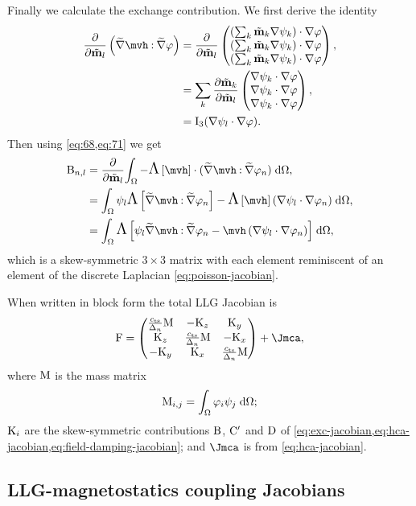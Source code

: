 {Finally we calculate the exchange contribution.
We first derive the identity
\begin{equation}
  \begin{aligned}
    \pd{}{\mvdis_l} \left(\gradv \mvh \compdot \gradv \tbf\right)
    &= \pd{}{\mvdis_l} \threevecdup{\left( \sum_k \mvdis_k \grad \sbf_k \right) \cdot \grad \tbf}, \\
    &=  \sum_k \pd{\mvdis_k}{\mvdis_l} \threevecdup{\grad \sbf_k \cdot \grad \tbf}, \\
    &=  \Idm_3 \bigb{ \grad \sbf_l \cdot \grad \tbf }.
    \label{eq:71}
  \end{aligned}
\end{equation}
Then using \cref{eq:68,eq:71} we get
\begin{equation}
  \begin{aligned}
   \Bm_{n,l} &=  \pd{}{\mvdis_l} \intd{- \skewm{\mvh} \cdot (\gradv \mvh \compdot \gradv \tbf_n)} ,\\
    &= \intd{ \sbf_l \skewm{\gradv \mvh \compdot \gradv \tbf_n}
       - \skewm{\mvh} \left( \grad \sbf_l \cdot \grad \tbf_n \right)}, \\
     &= \intd{\skewm{ \sbf_l \gradv \mvh \compdot \gradv \tbf_n
       - \mvh \left( \grad \sbf_l \cdot \grad \tbf_n \right)}},
   \label{eq:exc-jacobian}
   \end{aligned}
 \end{equation}
 which is a skew-symmetric $3\times 3$ matrix with each element reminiscent of an element of the discrete Laplacian \cref{eq:poisson-jacobian}.

When written in block form the total LLG Jacobian is
\begin{equation}
  \Fm =
  \begin{pmatrix}
    \jts \Mm    & -\Km_z       & \Km_y \\
    \Km_z         & \jts\Mm    & -\Km_x \\
    -\Km_y        & \Km_x        & \jts \Mm
  \end{pmatrix} + \Jmca,
  \label{eq:llg-jacobian}
\end{equation}
where $\mathrm{M}$ is the mass matrix
\begin{equation}
  \label{eq:mass-matrix}
  \mathrm{M}_{i,j} = {\int_{\Omega} {\varphi_i \psi_j} {\; \mathrm{{d}}} {\Omega}};
\end{equation}
$\mathrm{K}_i$ are the skew-symmetric contributions $\mathrm{B}$, $\mathrm{C}'$ and $\mathrm{D}$ of \cref{eq:exc-jacobian,eq:hca-jacobian,eq:field-damping-jacobian}; and $\Jmca$ is from \cref{eq:hca-jacobian}.


\subsection{LLG-magnetostatics coupling Jacobians}
\label{sec:llg-magn-coupl}

}
